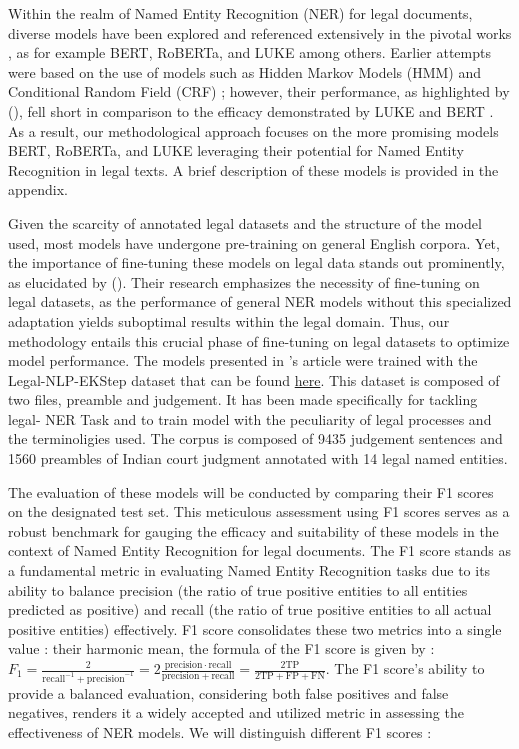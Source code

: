 \documentclass{article}
\begin{document}
Within the realm of Named Entity Recognition (NER) for legal documents, diverse models have been explored and referenced extensively in the pivotal works \cite{article1, article2}, as for example BERT, RoBERTa, and LUKE among others. Earlier attempts were based on the use of models such as Hidden Markov Models (HMM) \cite{HMM} and Conditional Random Field (CRF) \cite{CRF}; however, their performance, as highlighted by \citeauthor{E-NER} ()\cite{E-NER}, fell short in comparison to the efficacy demonstrated by LUKE and BERT \cite{E-NER}. As a result, our methodological approach focuses on the more promising models BERT, RoBERTa, and LUKE leveraging their potential for Named Entity Recognition in legal texts. A brief description of these models is provided in the appendix.

Given the scarcity of annotated legal datasets and the structure of the model used, most models have undergone pre-training on general English corpora. Yet, the importance of fine-tuning these models on legal data stands out prominently, as elucidated by \citeauthor{E-NER} ()\cite{E-NER}. Their research emphasizes the necessity of fine-tuning on legal datasets, as the performance of general NER models without this specialized adaptation yields suboptimal results within the legal domain. Thus, our methodology entails this crucial phase of fine-tuning on legal datasets to optimize model performance.
The models presented in \citeauthor{article2}'s article were trained with the Legal-NLP-EKStep dataset that can be found \href{https://github.com/Legal-NLP-EkStep/legal_NER}{here}. This dataset is composed of two files, preamble and judgement. It has been made specifically for tackling legal- NER Task and to train model with the peculiarity of legal processes and the terminoligies used. The corpus is composed of 9435 judgement sentences and 1560 preambles of Indian court judgment annotated with 14 legal named entities.



The evaluation of these models will be conducted by comparing their F1 scores on the designated test set. This meticulous assessment using F1 scores serves as a robust benchmark for gauging the efficacy and suitability of these models in the context of Named Entity Recognition for legal documents. The F1 score stands as a fundamental metric in evaluating Named Entity Recognition tasks due to its ability to balance precision (the ratio of true positive entities to all entities predicted as positive) and recall (the ratio of true positive entities to all actual positive entities) effectively. F1 score consolidates these two metrics into a single value : their harmonic mean, the formula of the F1 score is given by : $ F_1 = \frac{2}{\mathrm{recall}^{-1} + \mathrm{precision}^{-1}} = 2 \frac{\mathrm{precision} \cdot \mathrm{recall}}{\mathrm{precision} + \mathrm{recall}} = \frac{2\mathrm{TP}}{2\mathrm{TP} + \mathrm{FP} + \mathrm{FN}} $. The F1 score's ability to provide a balanced evaluation, considering both false positives and false negatives, renders it a widely accepted and utilized metric in assessing the effectiveness of NER models. We will distinguish different F1 scores : 
\end{document}
